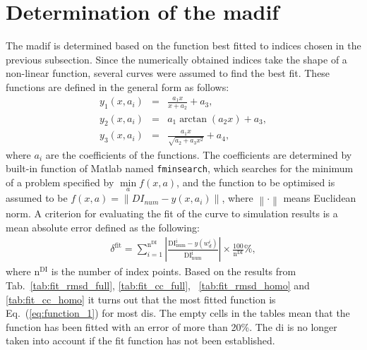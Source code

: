 \section{Determination of the \acs{madif}}
\label{sec:determination}

The \ac{madif} is determined based on the function best fitted to indices chosen in the previous subsection.
Since the numerically obtained indices take the shape of a non-linear function, several curves were assumed to find the best fit.
These functions are defined in the general form as follows:
\begin{eqnarray}
	y_1(x,a_i) & = & \frac{a_1x}{x+a_2}+a_3,
	\label{eq:function_1}\\
	y_2(x,a_i) & = & a_1\arctan\left(a_2x\right)+a_3,
	\label{eq:function_2}\\
	y_3(x,a_i) & = & \frac{a_1x}{\sqrt{a_2 + a_3x^2}}+a_4,\label{eq:function_3} 
\end{eqnarray}
where \(a_i\) are the coefficients of the functions.
The coefficients are determined by built-in function of Matlab named \verb+fminsearch+, which searches for the minimum of a problem specified by \(\min\limits_a f(x,a)\), and the function to be optimised is assumed to be \(f(x,a)=\left\|DI_{num} - y(x,a_i)\right\|\), where \(\left\|\cdot\right\|\) means Euclidean norm.
A criterion for evaluating the fit of the curve to simulation results is a mean absolute error defined as the following:
\begin{eqnarray}
	\delta^{\mathrm{fit}} = \sum_{i=1}^{\mathrm{n^{DI}}} \left|\frac{\mathrm{DI^i_{num}}-y(w_d^i)}{\mathrm{DI^i_{num}}}\right|\times\frac{100}{\mathrm{n^{DI}}}\%,
\end{eqnarray}
where \(\mathrm{n^{DI}}\) is the number of index points.
Based on the results from Tab.~\ref{tab:fit_rmsd_full}, \ref{tab:fit_cc_full},  ~\ref{tab:fit_rmsd_homo} and \ref{tab:fit_cc_homo} it turns out that the most fitted function is Eq.~(\ref{eq:function_1}) for most \acp{di}.
The empty cells in the tables mean that the function has been fitted with an error of more than 20\%.
The \ac{di} is no longer taken into account if the fit function has not been established.

